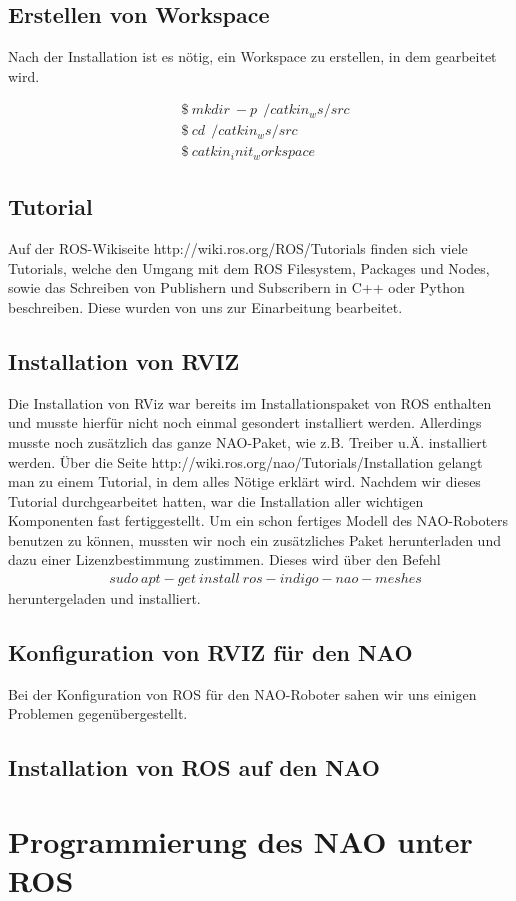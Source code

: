 \documentclass{scrartcl}
\begin{document}
\subsection{Erstellen von Workspace}

Nach der Installation ist es nötig, ein Workspace zu erstellen, in dem gearbeitet wird.

\begin{align}
&\$\ mkdir\ -p\ ~/catkin_ws/src\\
&\$\ cd\ ~/catkin_ws/src\\
&\$\ catkin_init_workspace
\end{align}
\subsection{Tutorial}
Auf der ROS-Wikiseite http://wiki.ros.org/ROS/Tutorials finden sich viele Tutorials, welche den Umgang mit dem ROS Filesystem, Packages und Nodes, sowie das Schreiben von Publishern und Subscribern in C++ oder Python beschreiben.
Diese wurden von uns zur Einarbeitung bearbeitet.
\subsection{Installation von RVIZ}
Die Installation von RViz war bereits im Installationspaket von ROS enthalten und musste hierfür nicht noch einmal gesondert installiert werden. Allerdings musste noch zusätzlich das ganze NAO-Paket, wie z.B. Treiber u.Ä. installiert werden. Über die Seite http://wiki.ros.org/nao/Tutorials/Installation gelangt man zu einem Tutorial, in dem alles Nötige erklärt wird. Nachdem wir dieses Tutorial durchgearbeitet hatten, war die Installation aller wichtigen Komponenten fast fertiggestellt. Um ein schon fertiges Modell des NAO-Roboters benutzen zu können, mussten wir noch ein zusätzliches Paket herunterladen und dazu einer Lizenzbestimmung zustimmen. Dieses wird über den Befehl
\begin{align}
&sudo\ apt-get\ install\ ros-indigo-nao-meshes
\end{align}
heruntergeladen und installiert.
\subsection{Konfiguration von RVIZ für den NAO}
Bei der Konfiguration von ROS für den NAO-Roboter sahen wir uns einigen Problemen gegenübergestellt. 
\subsection{Installation von ROS auf den NAO}


\section{Programmierung des NAO unter ROS}
\end{document}
